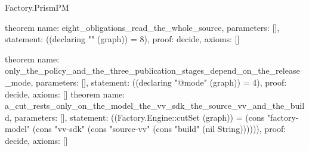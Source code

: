 \begin{lexlean}{Factory.PrismPM}
\begin{semanticmodule}
theorem{
  name: eight_obligations_read_the_whole_source,
  parameters: [],
  statement: ((declaring "" (graph)) = 8),
  proof: decide{},
  axioms: []
}

theorem{
  name: only_the_policy_and_the_three_publication_stages_depend_on_the_release_mode,
  parameters: [],
  statement: ((declaring "@mode" (graph)) = 4),
  proof: decide{},
  axioms: []
}
theorem{
  name: a_cut_rests_only_on_the_model_the_vv_sdk_the_source_vv_and_the_build,
  parameters: [],
  statement: ((Factory.Engine::cutSet (graph)) = (cons "factory-model" (cons "vv-sdk" (cons "source-vv" (cons "build" (nil String)))))),
  proof: decide{},
  axioms: []
}

\end{semanticmodule}
\end{lexlean}
